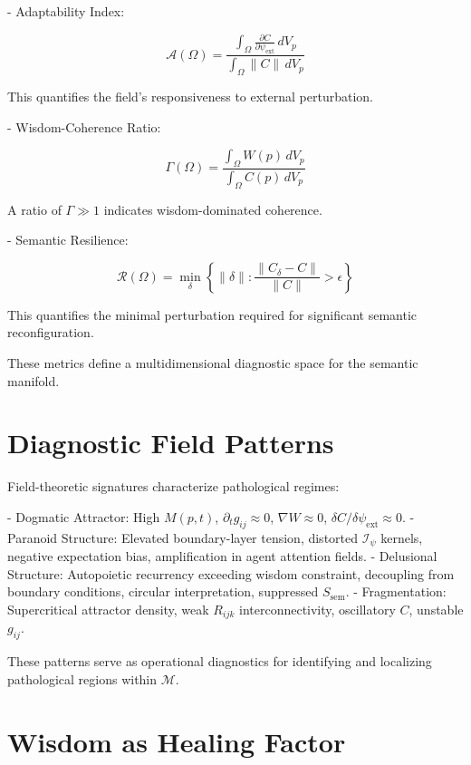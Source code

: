 - Adaptability Index:

\begin{equation}
\mathcal{A}(\Omega) = \frac{\int_{\Omega} \frac{\partial C}{\partial \psi_{\text{ext}}} \, dV_p}{\int_{\Omega} \|C\| \, dV_p}
\end{equation}

This quantifies the field's responsiveness to external perturbation.

- Wisdom-Coherence Ratio:

\begin{equation}
\Gamma(\Omega) = \frac{\int_{\Omega} W(p) \, dV_p}{\int_{\Omega} C(p) \, dV_p}
\end{equation}

A ratio of $\Gamma \gg 1$ indicates wisdom-dominated coherence.

- Semantic Resilience:

\begin{equation}
\mathcal{R}(\Omega) = \min_{\delta} \left\{\|\delta\| : \frac{\|C_{\delta} - C\|}{\|C\|} > \epsilon\right\}
\end{equation}

This quantifies the minimal perturbation required for significant semantic reconfiguration.

These metrics define a multidimensional diagnostic space for the semantic manifold.

\section{Diagnostic Field Patterns}

Field-theoretic signatures characterize pathological regimes:

- Dogmatic Attractor: High $M(p,t)$, $\partial_t g_{ij} \approx 0$, $\nabla W \approx 0$, $\delta C / \delta \psi_{\text{ext}} \approx 0$.
- Paranoid Structure: Elevated boundary-layer tension, distorted $\mathcal{I}_{\psi}$ kernels, negative expectation bias, amplification in agent attention fields.
- Delusional Structure: Autopoietic recurrency exceeding wisdom constraint, decoupling from boundary conditions, circular interpretation, suppressed $S_{\text{sem}}$.
- Fragmentation: Supercritical attractor density, weak $R_{ijk}$ interconnectivity, oscillatory $C$, unstable $g_{ij}$.

These patterns serve as operational diagnostics for identifying and localizing pathological regions within $\mathcal{M}$.

\section{Wisdom as Healing Factor}

